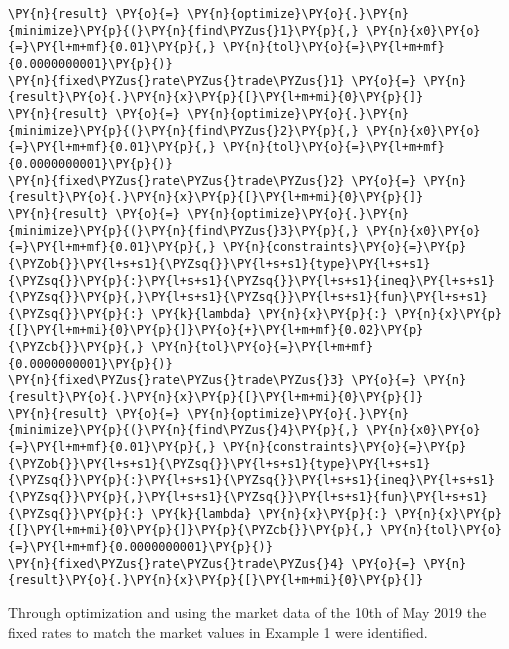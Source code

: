 \begin{tcolorbox}[breakable, size=fbox, boxrule=1pt, pad at break*=1mm,colback=cellbackground, colframe=cellborder]
\begin{Verbatim}[commandchars=\\\{\}]
\PY{n}{result} \PY{o}{=} \PY{n}{optimize}\PY{o}{.}\PY{n}{minimize}\PY{p}{(}\PY{n}{find\PYZus{}1}\PY{p}{,} \PY{n}{x0}\PY{o}{=}\PY{l+m+mf}{0.01}\PY{p}{,} \PY{n}{tol}\PY{o}{=}\PY{l+m+mf}{0.0000000001}\PY{p}{)}
\PY{n}{fixed\PYZus{}rate\PYZus{}trade\PYZus{}1} \PY{o}{=} \PY{n}{result}\PY{o}{.}\PY{n}{x}\PY{p}{[}\PY{l+m+mi}{0}\PY{p}{]}
\PY{n}{result} \PY{o}{=} \PY{n}{optimize}\PY{o}{.}\PY{n}{minimize}\PY{p}{(}\PY{n}{find\PYZus{}2}\PY{p}{,} \PY{n}{x0}\PY{o}{=}\PY{l+m+mf}{0.01}\PY{p}{,} \PY{n}{tol}\PY{o}{=}\PY{l+m+mf}{0.0000000001}\PY{p}{)}
\PY{n}{fixed\PYZus{}rate\PYZus{}trade\PYZus{}2} \PY{o}{=} \PY{n}{result}\PY{o}{.}\PY{n}{x}\PY{p}{[}\PY{l+m+mi}{0}\PY{p}{]}
\PY{n}{result} \PY{o}{=} \PY{n}{optimize}\PY{o}{.}\PY{n}{minimize}\PY{p}{(}\PY{n}{find\PYZus{}3}\PY{p}{,} \PY{n}{x0}\PY{o}{=}\PY{l+m+mf}{0.01}\PY{p}{,} \PY{n}{constraints}\PY{o}{=}\PY{p}{\PYZob{}}\PY{l+s+s1}{\PYZsq{}}\PY{l+s+s1}{type}\PY{l+s+s1}{\PYZsq{}}\PY{p}{:}\PY{l+s+s1}{\PYZsq{}}\PY{l+s+s1}{ineq}\PY{l+s+s1}{\PYZsq{}}\PY{p}{,}\PY{l+s+s1}{\PYZsq{}}\PY{l+s+s1}{fun}\PY{l+s+s1}{\PYZsq{}}\PY{p}{:} \PY{k}{lambda} \PY{n}{x}\PY{p}{:} \PY{n}{x}\PY{p}{[}\PY{l+m+mi}{0}\PY{p}{]}\PY{o}{+}\PY{l+m+mf}{0.02}\PY{p}{\PYZcb{}}\PY{p}{,} \PY{n}{tol}\PY{o}{=}\PY{l+m+mf}{0.0000000001}\PY{p}{)}
\PY{n}{fixed\PYZus{}rate\PYZus{}trade\PYZus{}3} \PY{o}{=} \PY{n}{result}\PY{o}{.}\PY{n}{x}\PY{p}{[}\PY{l+m+mi}{0}\PY{p}{]}
\PY{n}{result} \PY{o}{=} \PY{n}{optimize}\PY{o}{.}\PY{n}{minimize}\PY{p}{(}\PY{n}{find\PYZus{}4}\PY{p}{,} \PY{n}{x0}\PY{o}{=}\PY{l+m+mf}{0.01}\PY{p}{,} \PY{n}{constraints}\PY{o}{=}\PY{p}{\PYZob{}}\PY{l+s+s1}{\PYZsq{}}\PY{l+s+s1}{type}\PY{l+s+s1}{\PYZsq{}}\PY{p}{:}\PY{l+s+s1}{\PYZsq{}}\PY{l+s+s1}{ineq}\PY{l+s+s1}{\PYZsq{}}\PY{p}{,}\PY{l+s+s1}{\PYZsq{}}\PY{l+s+s1}{fun}\PY{l+s+s1}{\PYZsq{}}\PY{p}{:} \PY{k}{lambda} \PY{n}{x}\PY{p}{:} \PY{n}{x}\PY{p}{[}\PY{l+m+mi}{0}\PY{p}{]}\PY{p}{\PYZcb{}}\PY{p}{,} \PY{n}{tol}\PY{o}{=}\PY{l+m+mf}{0.0000000001}\PY{p}{)}
\PY{n}{fixed\PYZus{}rate\PYZus{}trade\PYZus{}4} \PY{o}{=} \PY{n}{result}\PY{o}{.}\PY{n}{x}\PY{p}{[}\PY{l+m+mi}{0}\PY{p}{]}
\end{Verbatim}
\end{tcolorbox}

    Through optimization and using the market data of the 10th of May 2019
the fixed rates to match the market values in Example 1 were identified.

